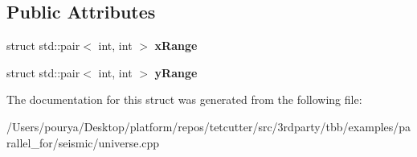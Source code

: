 \subsection*{Public Attributes}
\begin{DoxyCompactItemize}
\item 
\hypertarget{structUniverse_1_1Rectangle_ae4adadc300dfb164d01a43b11d16d1f2}{}struct std\+::pair$<$ int, int $>$ {\bfseries x\+Range}\label{structUniverse_1_1Rectangle_ae4adadc300dfb164d01a43b11d16d1f2}

\item 
\hypertarget{structUniverse_1_1Rectangle_a95e99c0b28e93724b14a71cee96deeec}{}struct std\+::pair$<$ int, int $>$ {\bfseries y\+Range}\label{structUniverse_1_1Rectangle_a95e99c0b28e93724b14a71cee96deeec}

\end{DoxyCompactItemize}


The documentation for this struct was generated from the following file\+:\begin{DoxyCompactItemize}
\item 
/\+Users/pourya/\+Desktop/platform/repos/tetcutter/src/3rdparty/tbb/examples/parallel\+\_\+for/seismic/universe.\+cpp\end{DoxyCompactItemize}
